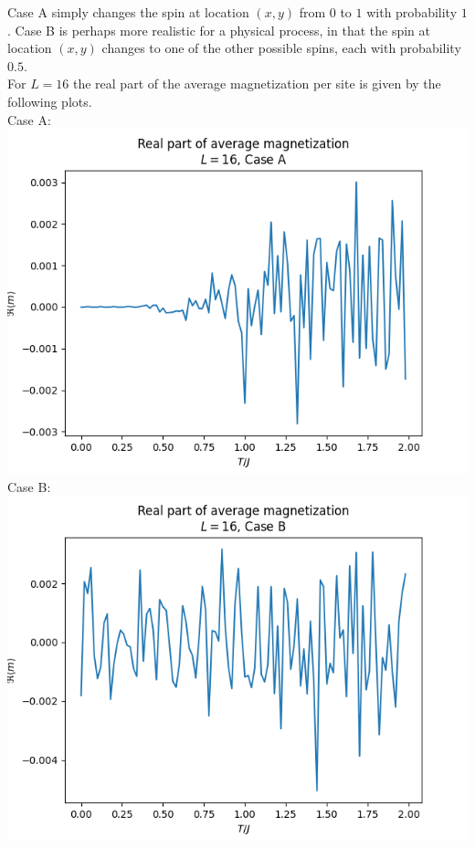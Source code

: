 \documentclass[12pt]{article}
\begin{document}
Case A simply changes the spin at location $(x, y)$ from $0$ to $1$ with
probability $1$. Case B is perhaps more realistic for a physical process, in
that the spin at location $(x, y)$ changes to one of the other possible spins, each with probability
$0.5$. \\
For $L=16$ the real part of the average magnetization per site is given by the following
plots. \\
Case A:\\
\includegraphics[width = \textwidth]{ram.png}\\
Case B: \\
\includegraphics[width = \textwidth]{r_ram.png}\\
\end{document}
